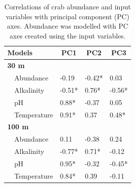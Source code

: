 \documentclass[letterpaper,12pt]{article}\usepackage[]{graphicx}\usepackage[]{color}
\begin{document}
\begin{landscape}
\centering\vspace*{\fill}
\begin{table}[!tbp]
\caption{Correlations of crab abundance and input variables with principal component (PC) axes. Abundance was modelled with PC axes created using the input variables.\label{tab:pcacor}} 
\begin{center}
\begin{tabular}{llll}
\hline\hline
\multicolumn{1}{l}{Models}&\multicolumn{1}{c}{PC1}&\multicolumn{1}{c}{PC2}&\multicolumn{1}{c}{PC3}\tabularnewline
\hline
{\bfseries 30 m}&&&\tabularnewline
~~Abundance&-0.19&-0.42*&0.03\tabularnewline
~~Alkalinity&-0.51*&0.76*&-0.56*\tabularnewline
~~pH&0.88*&-0.37&0.05\tabularnewline
~~Temperature&0.91*&0.37&0.48*\tabularnewline
\hline
{\bfseries 100 m}&&&\tabularnewline
~~Abundance&0.11&-0.38&0.24\tabularnewline
~~Alkalinity&-0.77*&0.71*&-0.12\tabularnewline
~~pH&0.95*&-0.32&-0.45*\tabularnewline
~~Temperature&0.84*&0.39&-0.11\tabularnewline
\hline
\end{tabular}\end{center}
\end{table}

\end{landscape}
\end{document}
